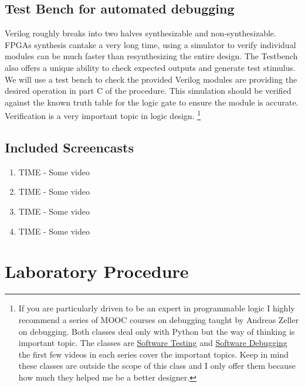     \subsection{Test Bench for automated debugging}
    Verilog roughly breaks into two halves synthesizable and non-synthesizable. FPGAs synthesis cantake a very long time, using a simulator to verify individual modules can be much faster than resynthesizing the entire design. The Testbench also offers a unique ability to check expected outputs and generate test stimulus. We will use a test bench to check the provided Verilog modules are providing the desired operation in part C of the procedure. This simulation should be verified against the known truth table for the logic gate to ensure the module is accurate. Verification is a very important topic in logic design. \footnote{If you are particularly driven to be an expert in programmable logic I highly recommend a series of MOOC courses on debugging taught by Andreas Zeller on debugging. Both classes deal only with Python but the way of thinking is important topic. The classes are \href{https://www.udacity.com/course/cs258}{Software Testing} and \href{https://www.udacity.com/course/cs259}{Software Debugging} the first few videos in each series cover the important topics. Keep in mind these classes are outside the scope of this class and I only offer them because how much they helped me be a better designer.}

  \subsection{Included Screencasts}
    \begin{enumerate}
      \item TIME - Some video
      \item TIME - Some video
      \item TIME - Some video
      \item TIME - Some video
    \end{enumerate}

\section{Laboratory Procedure}
